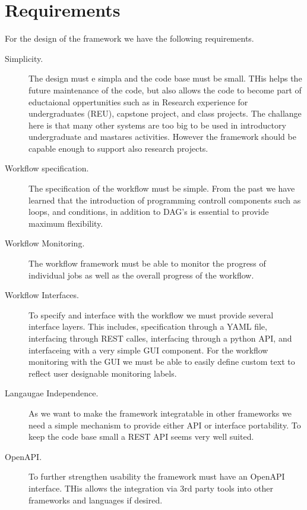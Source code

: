 
\section{Requirements}

For the design of the framework we have the following requirements.

\begin{description}

\item[Simplicity.] The design must e simpla and the code base must be small. THis helps the future maintenance of the code, but also allows the code to become part of eductaional oppertunities such as in Research experience for undergraduates (REU), capstone project, and class projects. The challange here is that many other systems are too big to be used in introductory undergraduate and mastares activities. 
However the framework should be capable enough to support also research projects.

\item[Workflow specification.]  The specification of the workflow must be simple. From the past we have learned that the introduction of programming controll components such as loops, and conditions, in addition to DAG's is essential to provide maximum flexibility. 

\item[Workflow Monitoring.] The workflow framework must be able to monitor the progress of individual jobs as well as the overall progress of the workflow. 

\item[Workflow Interfaces.] To specify and interface with the workflow we must provide several interface layers. This includes, specification through a YAML file, interfacing  through REST calles, interfacing through a python API, and interfaceing with a very simple GUI component. For the workflow monitoring with the GUI we must be able to easily define custom text to reflect user designable monitoring labels.

\item[Langaugae Independence.] As we want to make the framework integratable in other frameworks we need a simple mechanism to provide either API or interface portability. To keep the code base small a REST API seems very well suited.

\item[OpenAPI.] To further strengthen usability the framework must have an OpenAPI interface. THis allows the integration via 3rd party tools into other frameworks and languages if desired.


\end{description}
